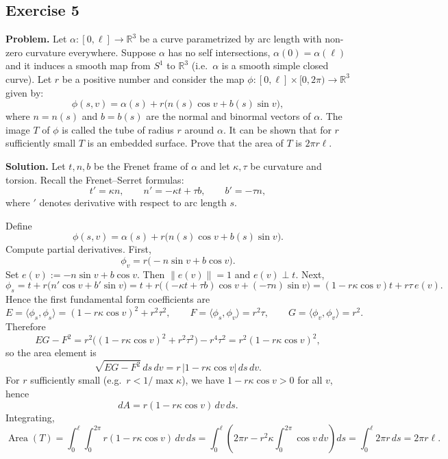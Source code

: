 \documentclass[12pt,a4paper]{article}
\theoremstyle{plain}
\theoremstyle{definition}      %
\begin{document}
	
	\subsection*{Exercise 5}
	
	\noindent\textbf{Problem.}
	Let $\alpha:[0,\ell]\to\mathbb R^3$ be a curve parametrized by arc length with non-zero curvature everywhere.
	Suppose $\alpha$ has no self intersections, $\alpha(0)=\alpha(\ell)$ and it induces a smooth map from $S^1$ to $\mathbb R^3$
	(i.e.\ $\alpha$ is a smooth simple closed curve). Let $r$ be a positive number and consider the map
	$\phi:[0,\ell]\times[0,2\pi)\to\mathbb R^3$ given by:
	\[
	\phi(s,v)=\alpha(s)+r\big(n(s)\cos v+b(s)\sin v\big),
	\]
	where $n=n(s)$ and $b=b(s)$ are the normal and binormal vectors of $\alpha$.
	The image $T$ of $\phi$ is called the tube of radius $r$ around $\alpha$.
	It can be shown that for $r$ sufficiently small $T$ is an embedded surface. Prove that the area of $T$ is $2\pi r\ell$.
	
	\medskip
	\noindent\textbf{Solution.}
	Let $t,n,b$ be the Frenet frame of $\alpha$ and let $\kappa,\tau$ be curvature and torsion.
	Recall the Frenet--Serret formulas:
	\[
	t'=\kappa n,\qquad n'=-\kappa t+\tau b,\qquad b'=-\tau n,
	\]
	where $'$ denotes derivative with respect to arc length $s$.
	
	Define
	\[
	\phi(s,v)=\alpha(s)+r\big(n(s)\cos v+b(s)\sin v\big).
	\]
	Compute partial derivatives. First,
	\[
	\phi_v = r\big(-n\sin v + b\cos v\big).
	\]
	Set $e(v):=-n\sin v + b\cos v$. Then $\|e(v)\|=1$ and $e(v)\perp t$.
	Next,
	\[
	\phi_s
	= t + r\big(n'\cos v + b'\sin v\big)
	= t + r\Big((-\kappa t+\tau b)\cos v + (-\tau n)\sin v\Big)
	= (1-r\kappa\cos v)t + r\tau\,e(v).
	\]
	Hence the first fundamental form coefficients are
	\[
	E=\langle \phi_s,\phi_s\rangle = (1-r\kappa\cos v)^2 + r^2\tau^2,\qquad
	F=\langle \phi_s,\phi_v\rangle = r^2\tau,\qquad
	G=\langle \phi_v,\phi_v\rangle = r^2.
	\]
	Therefore
	\[
	EG-F^2
	= r^2\big((1-r\kappa\cos v)^2 + r^2\tau^2\big)-r^4\tau^2
	= r^2(1-r\kappa\cos v)^2,
	\]
	so the area element is
	\[
	\sqrt{EG-F^2}\,ds\,dv = r\,|1-r\kappa\cos v|\,ds\,dv.
	\]
	For $r$ sufficiently small (e.g.\ $r<1/\max\kappa$), we have $1-r\kappa\cos v>0$ for all $v$, hence
	\[
	dA = r(1-r\kappa\cos v)\,dv\,ds.
	\]
	Integrating,
	\[
	\operatorname{Area}(T)
	=\int_0^\ell\int_0^{2\pi} r(1-r\kappa\cos v)\,dv\,ds
	=\int_0^\ell \left(2\pi r - r^2\kappa\int_0^{2\pi}\cos v\,dv\right)ds
	=\int_0^\ell 2\pi r\,ds
	=2\pi r\ell.
	\]
	
	
	
\end{document}
